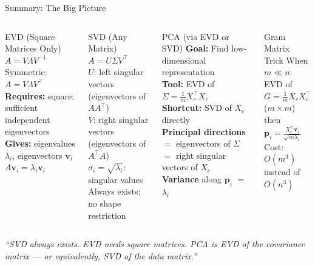 \documentclass{beamer}
\begin{document}
\begin{frame}[shrink=10]{Summary: The Big Picture}
  \begin{columns}[T]
    \begin{block}{EVD (Square Matrices Only)}
      $A = V\Lambda V^{-1}$\\
      Symmetric: $A = V\Lambda V^\top$\\
      \textbf{Requires:} square; sufficient independent eigenvectors\\
      \textbf{Gives:} eigenvalues $\lambda_i$, eigenvectors $\mathbf{v}_i$\\
      $A\mathbf{v}_i = \lambda_i\mathbf{v}_i$
    \end{block}

    \begin{block}{SVD (Any Matrix)}
      $A = U\Sigma V^\top$\\
      $U$: left singular vectors (eigenvectors of $AA^\top$)\\
      $V$: right singular vectors (eigenvectors of $A^\top A$)\\
      $\sigma_i = \sqrt{\lambda_i}$: singular values\\
      Always exists; no shape restriction
    \end{block}

    \begin{block}{PCA (via EVD or SVD)}
      \textbf{Goal:} Find low-dimensional representation\\
      \textbf{Tool:} EVD of $\Sigma = \frac{1}{m}X_c^\top X_c$\\
      \textbf{Shortcut:} SVD of $X_c$ directly\\
      \textbf{Principal directions} $=$ eigenvectors of $\Sigma$\\
            $=$ right singular vectors of $X_c$\\
      \textbf{Variance} along $\mathbf{p}_i$ $=$ $\lambda_i$
    \end{block}

    \begin{alertblock}{Gram Matrix Trick}
      When $m \ll n$:\\
      EVD of $G = \frac{1}{m}X_c X_c^\top$ ($m{\times}m$)\\
      then $\mathbf{p}_i = \frac{X_c^\top\mathbf{v}_i}{\sqrt{m\lambda_i}}$\\
      Cost: $O(m^3)$ instead of $O(n^3)$
    \end{alertblock}
  \end{columns}

  \medskip

  \begin{center}
    \large\textit{%
      ``SVD always exists. EVD needs square matrices.
        PCA is EVD of the covariance matrix --- or equivalently,
        SVD of the data matrix.''}
  \end{center}
\end{frame}
\end{document}
